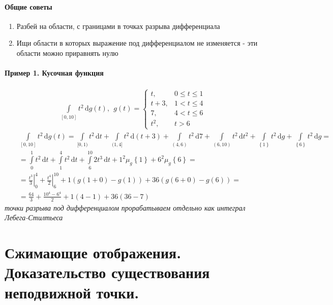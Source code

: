\documentclass{article}[12pt]
\renewcommand{\d}{\,\mathrm{d}}
\begin{document}
\paragraph{Общие советы}
\begin{enumerate}
    \item Разбей на области, с границами в точках разрыва дифференциала
    \item Ищи области в которых выражение под дифференциалом не
        изменяется - эти области можно приравнять нулю
\end{enumerate}

\paragraph{Пример 1. Кусочная функция}
\begin{eqnarray*}
    \int\limits_{[0,10]}t^{2}\d{g(t)},\ \ g(t)=\left\{\begin{array}{cc}
            t,&0\leqslant t\leqslant 1\\
            t+3,&1< t\leqslant 4\\
            7,&4<t\leqslant 6\\
            t^{2},&t>6
    \end{array} \right.
\end{eqnarray*}
\begin{eqnarray*}
    &&\int\limits_{[0,10]}t^{2}\d{g(t)}=\int\limits_{[0,1)}t^{2}\d{t}
    +\int\limits_{(1,4]}t^{2}\d{(t+3)}+\int\limits_{(4,6)}t^{2}\d{7}
    +\int\limits_{(6,10)}t^{2}\d{t^{2}}
    +\int\limits_{\left\{1\right\}}t^{2}\d{g}
    +\int\limits_{\left\{6\right\}}t^{2}\d{g}=\\
    &&=\int\limits_{0}^{1}t^{2}\d{t}+\int\limits_{1}^{4}t^{2}\d{t}
    +\int\limits_{6}^{10}2t^{3}\d{t}
    +1^{2}\mu_{g}\left\{1\right\}+6^{2}\mu_{g}\left\{6\right\}=\\
    &&=\left.\frac{t^{3}}{3}\right|^{4}_{0}+\left.\frac{t^{4}}{2}\right|^{10}_{6}
    +1(g(1+0)-g(1))+36(g(6+0)-g(6))=\\
    &&=\frac{64}{3}+\frac{10^{4}-6^{4}}{2}+1(4-1)+36(36-7)
\end{eqnarray*}
\textit{точки разрыва под дифференциалом прорабатываем отдельно как интеграл Лебега-Стилтьеса}

\section{Сжимающие отображения. Доказательство существования
неподвижной точки.}
\end{document}
